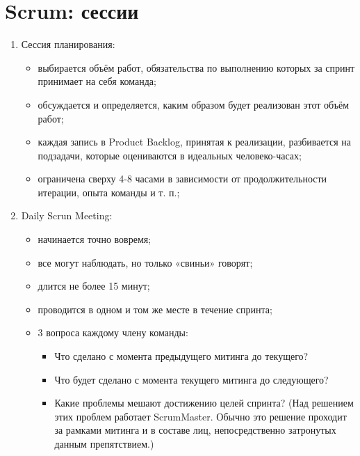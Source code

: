 \documentclass{article}
\let\stdsection\section
\renewcommand\section{\newpage\stdsection}
\begin{document}
\section{Scrum: сессии}
    \begin{enumerate}
        \item Сессия планирования:
        \begin{itemize}
            \item выбирается объём работ, обязательства по выполнению которых за спринт принимает на себя команда;
            \item обсуждается и определяется, каким образом будет реализован этот объём работ;
            \item каждая запись в Product Backlog, принятая к реализации, разбивается на подзадачи, которые оцениваются в идеальных человеко-часах;
            \item ограничена сверху 4-8 часами в зависимости от продолжительности итерации, опыта команды и т. п.;
        \end{itemize}

        \item Daily Scrun Meeting:
        \begin{itemize}
            \item начинается точно вовремя;
            \item все могут наблюдать, но только «свиньи» говорят;
            \item длится не более 15 минут;
            \item проводится в одном и том же месте в течение спринта;
            \item 3 вопроса каждому члену команды:
            \begin{itemize}
                \item Что сделано с момента предыдущего митинга до текущего?
                \item Что будет сделано с момента текущего митинга до следующего?
                \item Какие проблемы мешают достижению целей спринта? (Над решением этих проблем работает ScrumMaster. Обычно это решение проходит за рамками митинга и в составе лиц, непосредственно затронутых данным препятствием.)
            \end{itemize}
        \end{itemize}


\end{enumerate}
\end{document}
